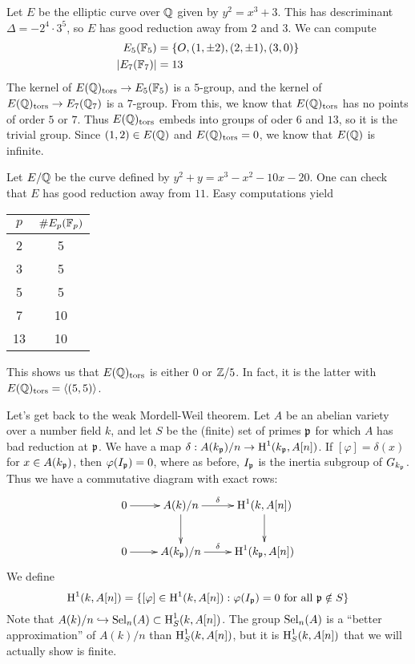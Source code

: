 \documentclass{article}
\begin{document}
\begin{example}
Let $E$ be the elliptic curve over $\mathbb{Q}$ given by $y^2=x^3+3$. This has 
descriminant $\Delta=-2^4\cdot 3^5$, so $E$ has good reduction away from $2$ 
and $3$. We can compute 
\begin{align*}
  E_5(\mathbb{F}_5) &= \{O,(1,\pm 2),(2,\pm 1),(3,0)\} \\
  \left|E_7(\mathbb{F}_7)\right| &= 13
\end{align*}
The kernel of $E(\mathbb{Q})_\text{tors}\to E_5(\mathbb{F}_5)$ is a $5$-group, and the kernel 
of $E(\mathbb{Q})_\text{tors}\to E_7(\mathbb{Q}_7)$ is a $7$-group. From this, we know that 
$E(\mathbb{Q})_\text{tors}$ has no points of order $5$ or $7$. Thus  
$E(\mathbb{Q})_\text{tors}$ embeds into groups of oder $6$ and $13$, so it is the 
trivial group. Since $(1,2)\in E(\mathbb{Q})$ and $E(\mathbb{Q})_\text{tors}=0$, we know that 
$E(\mathbb{Q})$ is infinite. 
\end{example}

\begin{example}
Let $E/\mathbb{Q}$ be the curve defined by $y^2 + y = x^3-x^2-10 x-20$. One can check 
that $E$ has good reduction away from $11$. Easy computations yield 
\begin{center}
  \begin{tabular}{c|c}
    $p$ & $  \# E_p(\mathbb{F}_p)$ \\ \hline
    2   & 5  \\
    3   & 5  \\
    5   & 5  \\
    7   & 10 \\
    13  & 10
  \end{tabular}
\end{center}
This shows us that $E(\mathbb{Q})_\text{tors}$ is either $0$ or $\mathbb{Z}/5$. In fact, it 
is the latter with $E(\mathbb{Q})_\text{tors}=\langle (5,5)\rangle$. 
\end{example}

Let's get back to the weak Mordell-Weil theorem. Let $A$ be an abelian variety 
over a number field $k$, and let $S$ be the (finite) set of primes $\mathfrak{p}$ for 
which $A$ has bad reduction at $\mathfrak{p}$. We have a map 
$\delta:A(k_{\mathfrak{p}})/n \to\operatorname{H}^1(k_{\mathfrak{p}},A[n])$. If $[\varphi]=\delta(x)$ for 
$x\in A(k_{\mathfrak{p}})$, then $\varphi(I_{\mathfrak{p}}) = 0$, where as before, $I_{\mathfrak{p}}$ is the 
inertia subgroup of $G_{k_{\mathfrak{p}}}$. Thus we have a commutative diagram with 
exact rows:
\[\xymatrix{
  0 \ar[r] 
    & A(k)/n \ar[r]^-\delta \ar[d]
    & \h^1(k,A[n]) \ar[d] \\
  0 \ar[r]
    & A(k_\fp)/n \ar[r]^-\delta 
    & \h^1(k_\fp,A[n])
}\]
We define 
\[
  \operatorname{H}^1(k,A[n]) = \{[\varphi]\in \operatorname{H}^1(k,A[n]) : \varphi(I_{\mathfrak{p}}) = 0\text{ for all }\mathfrak{p}\notin S\}
\]
Note that $A(k)/n\hookrightarrow \operatorname{Sel}_n(A)\subset \operatorname{H}_S^1(k,A[n])$. The group 
$\operatorname{Sel}_n(A)$ is a ``better approximation'' of $A(k)/n$ than $\operatorname{H}_S^1(k,A[n])$, 
but it is $\operatorname{H}_S^1(k,A[n])$ that we will actually show is finite. 
\end{document}
